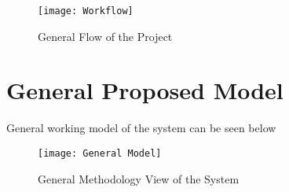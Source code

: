 \begin{figure}[h]
  \centering
  \texttt{[image: Workflow]}
  \caption{General Flow of the Project}
\end{figure}

\section{General Proposed Model}
General working model of the system can be seen below

\begin{figure}[h]
  \centering
  \texttt{[image: General Model]}
  \caption{General Methodology View of the System}
\end{figure}

\newpage


